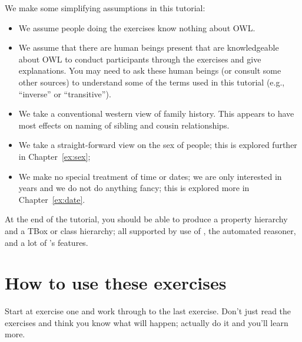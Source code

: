 We make some simplifying assumptions in this tutorial:
\begin{itemize}
\item We assume people doing the exercises know nothing about OWL.
\item We assume that there are human beings present that are knowledgeable about OWL to conduct participants through the exercises and give explanations. You may need to ask these human beings (or consult some other sources) to understand some of the terms used in this tutorial (e.g., ``inverse'' or ``transitive''). 
\item We take a conventional western  view of family history. This appears to have most effects on naming of sibling and cousin relationships.
\item We take a straight-forward view on the sex of people; this is explored further in Chapter~\ref{ex:sex};
\item We make no special treatment of time or dates; we are only interested in years and we do not do anything fancy; this is explored more in Chapter~\ref{ex:date}.
\end{itemize}
At the end of the tutorial, you should be able to produce a property hierarchy and a TBox or class hierarchy; all supported by use of \protege, the automated reasoner, and a lot of \owlii's features.




\section{How to use these exercises}

Start at exercise one and work through to the last exercise. Don't just read the exercises and think you know what will happen; actually do it and you'll learn more. 
